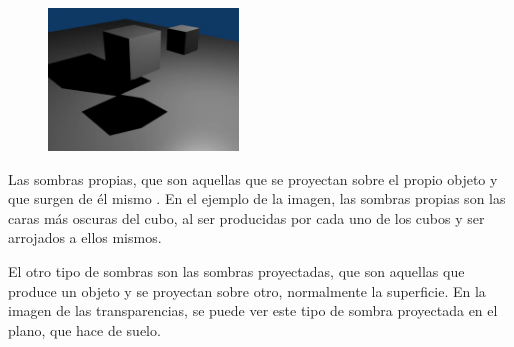 \documentclass{article}
\begin{document}
\begin{figure}[H]
    \centering
    \includegraphics[width=0.45\textwidth]{imagenes/sombra0004.png}
 \end{figure}    

Las sombras propias, que son aquellas que se proyectan sobre el propio objeto y que surgen de él mismo \cite{sombras}. En el ejemplo de la imagen, las sombras propias son las caras más oscuras del cubo, al ser producidas por cada uno de los cubos y ser arrojados a ellos mismos.

\newpage

El otro tipo de sombras son las sombras proyectadas, que son aquellas que produce un objeto y se proyectan sobre otro, normalmente la superficie. En la imagen de las transparencias, se puede ver este tipo de sombra proyectada en el plano, que hace de suelo.
\end{document}

